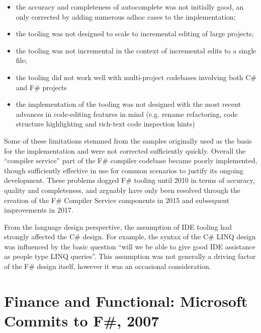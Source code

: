\documentclass[acmsmall,review]{acmart}\settopmatter{printfolios=true,printccs=false,printacmref=false}
\begin{document}
\begin{itemize}
\item the accuracy and completeness of autocomplete was not initially good, an only corrected by adding numerous adhoc cases to the implementation;
\item the tooling was not designed to scale to incremental editing of large projects;
\item the tooling was not incremental in the context of incremental edits to a single file;
\item the tooling did not work well with multi-project codebases involving both C\# and F\# projects
\item the implementation of the tooling was not designed with the most recent advances in code-editing features in mind (e.g. rename refactoring, code structure highlighting and rich-text code inspection hints) 
\end{itemize}

Some of these limitations stemmed from the samples originally used as the basis for the implementation and were not corrected sufficiently quickly.  Overall the “compiler service” part of the F\# compiler codebase became poorly implemented, though sufficiently effective in use for common scenarios to justify its ongoing development.  These problems dogged F\# tooling until 2010 in terms of accuracy, quality and completeness, and arguably have only been resolved through the creation of the F\# Compiler Service components in 2015 and subsequent improvements in 2017.  

From the language design perspective, the assumption of IDE tooling had strongly affected the C\# design.  For example, the syntax of the C\# LINQ design was influenced by the basic question “will we be able to give good IDE assistance as people type LINQ queries”.  This assumption was not generally a driving factor of the F\# design itself, however it was an occasional consideration.



\section*{Finance and Functional: Microsoft Commits to F\#, 2007}
\end{document}
